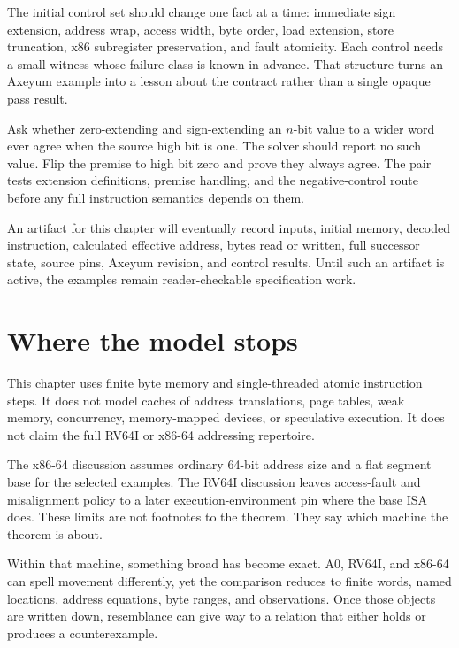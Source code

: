 The initial control set should change one fact at a time: immediate sign
extension, address wrap, access width, byte order, load extension, store
truncation, x86 subregister preservation, and fault atomicity. Each control
needs a small witness whose failure class is known in advance. That structure
turns an Axeyum example into a lesson about the contract rather than a single
opaque pass result.

\begin{goingdeeper}[title={A good first solver question}]
Ask whether zero-extending and sign-extending an \(n\)-bit value to a wider
word ever agree when the source high bit is one. The solver should report no
such value. Flip the premise to high bit zero and prove they always agree. The
pair tests extension definitions, premise handling, and the negative-control
route before any full instruction semantics depends on them.
\end{goingdeeper}

An artifact for this chapter will eventually record inputs, initial memory,
decoded instruction, calculated effective address, bytes read or written, full
successor state, source pins, Axeyum revision, and control results. Until such
an artifact is active, the examples remain reader-checkable specification work.

\section{Where the model stops}

This chapter uses finite byte memory and single-threaded atomic instruction
steps. It does not model caches of address translations, page tables,
weak memory, concurrency, memory-mapped devices, or speculative execution. It
does not claim the full RV64I or x86-64 addressing repertoire.

The x86-64 discussion assumes ordinary 64-bit address size and a flat segment
base for the selected examples. The RV64I discussion leaves access-fault and
misalignment policy to a later execution-environment pin where the base ISA
does. These limits are not footnotes to the theorem. They say
which machine the theorem is about.

Within that machine, something broad has become exact. A0, RV64I, and x86-64
can spell movement differently, yet the comparison reduces to finite words,
named locations, address equations, byte ranges, and observations. Once those
objects are written down, resemblance can give way to a relation that either
holds or produces a counterexample.

